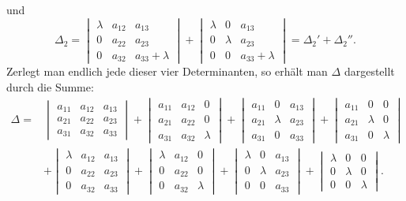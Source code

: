 und
\[
\varDelta_2 = \begin{vmatrix} \lambda & a_{12} & a_{13}\\ 0 & a_{22} & a_{23}\\ 0 & a_{32} & a_{33}+\lambda\end{vmatrix}
+ \begin{vmatrix} \lambda & 0 & a_{13}\\ 0 & \lambda & a_{23}\\ 0 & 0 & a_{33}+\lambda\end{vmatrix}
= \varDelta_2'+\varDelta_2''.
\]
Zerlegt man endlich jede dieser vier Determinanten, so erhält man $\varDelta$ dargestellt durch die Summe:
\[
\begin{aligned}
\varDelta ={}& \begin{vmatrix} a_{11} & a_{12} & a_{13}\\ a_{21} & a_{22} & a_{23}\\ a_{31} & a_{32} & a_{33}\end{vmatrix}
+ \begin{vmatrix} a_{11} & a_{12} & 0\\ a_{21} & a_{22} & 0\\ a_{31} & a_{32} & \lambda\end{vmatrix}
+ \begin{vmatrix} a_{11} & 0 & a_{13}\\ a_{21} & \lambda & a_{23}\\ a_{31} & 0 & a_{33}\end{vmatrix}
+ \begin{vmatrix} a_{11} & 0 & 0\\ a_{21} & \lambda & 0\\ a_{31} & 0 & \lambda\end{vmatrix}\\
&+ \begin{vmatrix} \lambda & a_{12} & a_{13}\\ 0 & a_{22} & a_{23}\\ 0 & a_{32} & a_{33}\end{vmatrix}
+ \begin{vmatrix} \lambda & a_{12} & 0\\ 0 & a_{22} & 0\\ 0 & a_{32} & \lambda\end{vmatrix}
+ \begin{vmatrix} \lambda & 0 & a_{13}\\ 0 & \lambda & a_{23}\\ 0 & 0 & a_{33}\end{vmatrix}
+ \begin{vmatrix} \lambda & 0 & 0\\ 0 & \lambda & 0\\ 0 & 0 & \lambda\end{vmatrix}.
\end{aligned}
\]


